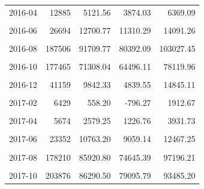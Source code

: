 \begin{longtable}[t]{crrrr}
2016-04 & 12885 & 5121.56 & 3874.03 & 6369.09\\
\cellcolor{gray!10}{2016-05} & \cellcolor{gray!10}{13881} & \cellcolor{gray!10}{6308.51} & \cellcolor{gray!10}{5444.26} & \cellcolor{gray!10}{7172.76}\\
2016-06 & 26694 & 12700.77 & 11310.29 & 14091.26\\
\cellcolor{gray!10}{2016-07} & \cellcolor{gray!10}{87442} & \cellcolor{gray!10}{30357.99} & \cellcolor{gray!10}{28139.87} & \cellcolor{gray!10}{32576.11}\\
2016-08 & 187506 & 91709.77 & 80392.09 & 103027.45\\
\cellcolor{gray!10}{2016-09} & \cellcolor{gray!10}{215313} & \cellcolor{gray!10}{89058.08} & \cellcolor{gray!10}{67301.37} & \cellcolor{gray!10}{110814.79}\\
2016-10 & 177465 & 71308.04 & 64496.11 & 78119.96\\
\cellcolor{gray!10}{2016-11} & \cellcolor{gray!10}{95867} & \cellcolor{gray!10}{37237.87} & \cellcolor{gray!10}{31284.37} & \cellcolor{gray!10}{43191.37}\\
2016-12 & 41159 & 9842.33 & 4839.55 & 14845.11\\
\cellcolor{gray!10}{2017-01} & \cellcolor{gray!10}{14234} & \cellcolor{gray!10}{3591.14} & \cellcolor{gray!10}{1561.84} & \cellcolor{gray!10}{5620.44}\\
2017-02 & 6429 & 558.20 & -796.27 & 1912.67\\
\cellcolor{gray!10}{2017-03} & \cellcolor{gray!10}{6417} & \cellcolor{gray!10}{215.73} & \cellcolor{gray!10}{-2439.37} & \cellcolor{gray!10}{2870.84}\\
2017-04 & 5674 & 2579.25 & 1226.76 & 3931.73\\
\cellcolor{gray!10}{2017-05} & \cellcolor{gray!10}{10583} & \cellcolor{gray!10}{4624.58} & \cellcolor{gray!10}{3435.19} & \cellcolor{gray!10}{5813.96}\\
2017-06 & 23352 & 10763.20 & 9059.14 & 12467.25\\
\cellcolor{gray!10}{2017-07} & \cellcolor{gray!10}{72520} & \cellcolor{gray!10}{26247.22} & \cellcolor{gray!10}{24817.14} & \cellcolor{gray!10}{27677.31}\\
2017-08 & 178210 & 85920.80 & 74645.39 & 97196.21\\
\cellcolor{gray!10}{2017-09} & \cellcolor{gray!10}{368188} & \cellcolor{gray!10}{209118.98} & \cellcolor{gray!10}{179818.85} & \cellcolor{gray!10}{238419.10}\\
2017-10 & 203876 & 86290.50 & 79095.79 & 93485.20\\

\end{longtable}
